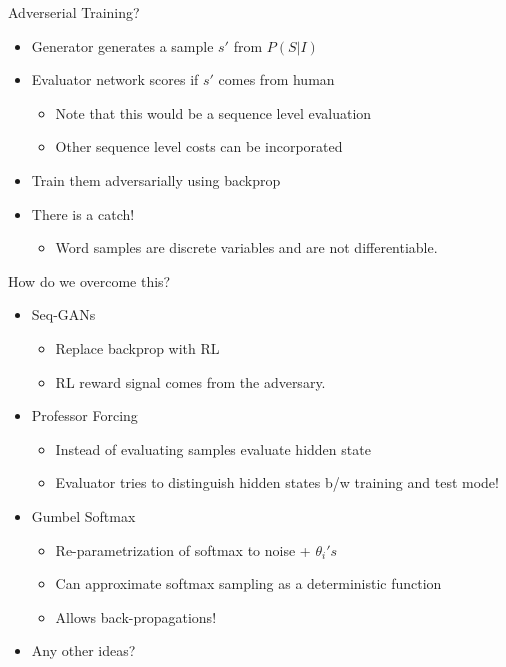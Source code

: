 \documentclass{beamer}
\begin{document}
\begin{frame}{Adverserial Training?}
    \begin{itemize}
        \item Generator generates a sample $s'$ from $P(S|I)$
        \item Evaluator network scores if $s'$ comes from human 
            \begin{itemize}
                \item Note that this would be a sequence level evaluation
                \item Other sequence level costs can be incorporated
            \end{itemize}
        \item Train them adversarially using backprop
        \item There is a catch! 
            \begin{itemize}
                \item Word samples are discrete variables and are not differentiable.
            \end{itemize}
    \end{itemize}
\end{frame}
\begin{frame}{How do we overcome this?}
    \begin{itemize}
        \item Seq-GANs~\cite{yu2016seqgan} 
            \begin{itemize}
                \item Replace backprop with RL 
                \item RL reward signal comes from the adversary.
            \end{itemize}
        \item Professor Forcing~\cite{lamb2016professor}
            \begin{itemize}
                \item Instead of evaluating samples evaluate hidden state
                \item Evaluator tries to distinguish hidden states b/w training and test mode!
            \end{itemize}
        \item Gumbel Softmax~\cite{jang2016categorical}
            \begin{itemize}
                \item Re-parametrization of softmax to noise + $\theta_i's$
                \item Can approximate softmax sampling as a deterministic function
                \item Allows back-propagations!
            \end{itemize}
        \item Any other ideas?
    \end{itemize}
\end{frame}
\end{document}
